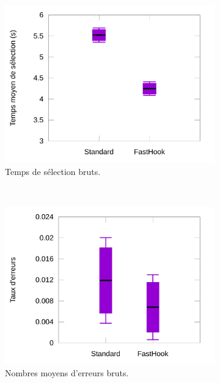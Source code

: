	\begin{figure}[htbp]
		\begin{subfigure}[t]{0.49\textwidth}
			\centering
			\includegraphics[width=\textwidth]{figures/ch5/brownRawTimes}
			\caption{Temps de sélection bruts.}
			\label{fig:brownRawTimes}
		\end{subfigure}
		~
		\begin{subfigure}[t]{0.49\textwidth}
			\centering
			\includegraphics[width=\textwidth]{figures/ch5/brownRawErrors}
			\caption{Nombres moyens d'erreurs bruts.}
			\label{fig:brownRawErrors}
		\end{subfigure}
		~
		\begin{subfigure}[t]{0.49\textwidth}
			\centering

\end{subfigure}
\end{figure}
